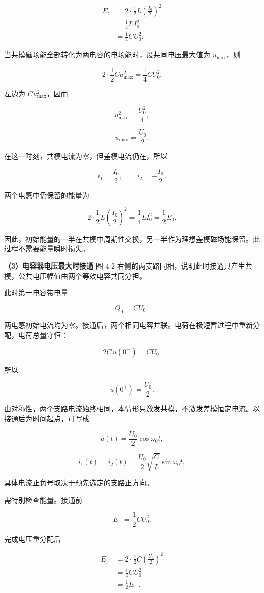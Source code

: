 \documentclass[12pt,a4paper,UTF8]{ctexart}
\begin{document}
\[\begin{aligned}
E_c
&=2\cdot\frac12L\left(\frac{I_0}{2}\right)^2\\
&=\frac14LI_0^2\\
&=\frac14CU_0^2.
\end{aligned}\]

当共模磁场能全部转化为两电容的电场能时，设共同电压最大值为
\(u_{\max}\)，则

\[2\cdot\frac12C u_{\max}^2=\frac14CU_0^2.\]

左边为 \(Cu_{\max}^2\)，因而

\[u_{\max}^2=\frac{U_0^2}{4},\]

\[\boxed{u_{\max}=\frac{U_0}{2}}.\]

在这一时刻，共模电流为零，但差模电流仍在，所以

\[i_1=\frac{I_0}{2},\qquad i_2=-\frac{I_0}{2}.\]

两个电感中仍保留的能量为

\[2\cdot\frac12L\left(\frac{I_0}{2}\right)^2
=\frac14LI_0^2
=\frac12E_0.\]

因此，初始能量的一半在共模中周期性交换，另一半作为理想差模磁场能保留。此过程不需要能量瞬时损失。

\textbf{（3）电容器电压最大时接通} 图 4-2
右侧的两支路同相，说明此时接通只产生共模，公共电压幅值由两个等效电容共同分担。

此时第一电容带电量

\[Q_0=CU_0,\]

两电感初始电流均为零。接通后，两个相同电容并联。电荷在极短暂过程中重新分配，电荷总量守恒：

\[2C\,u(0^+)=CU_0.\]

所以

\[u(0^+)=\frac{U_0}{2}.\]

由对称性，两个支路电流始终相同，本情形只激发共模，不激发差模恒定电流。以接通后为时间起点，可写成

\[u(t)=\frac{U_0}{2}\cos\omega_0t,\]

\[i_1(t)=i_2(t)=\frac{U_0}{2}\sqrt{\frac CL}\sin\omega_0t,\]

具体电流正负号取决于预先选定的支路正方向。

需特别检查能量。接通前

\[E_-=\frac12CU_0^2.\]

完成电压重分配后

\[\begin{aligned}
E_+
&=2\cdot\frac12C\left(\frac{U_0}{2}\right)^2\\
&=\frac14CU_0^2\\
&=\frac12E_-.
\end{aligned}\]
\end{document}
